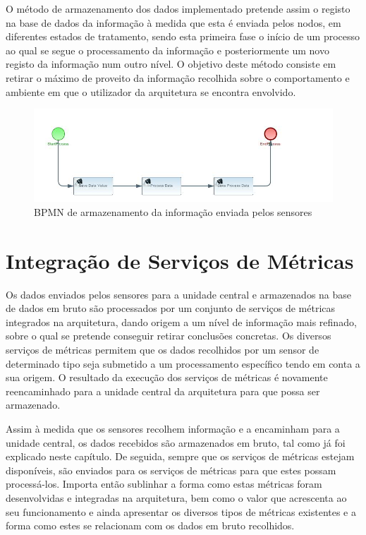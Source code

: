 O método de armazenamento dos dados implementado pretende assim o registo na base de dados da informação à medida que esta é enviada pelos nodos, em diferentes estados de tratamento, sendo esta primeira fase o início de um processo ao qual se segue o processamento da informação e posteriormente um novo registo da informação num outro nível. O objetivo deste método consiste em retirar o máximo de proveito da informação recolhida sobre o comportamento e ambiente em que o utilizador da arquitetura se encontra envolvido. 

\begin{figure}[htb]
   \centering
   \includegraphics[scale=0.6]{Images/SaveDataComponent.jpg}
   \caption{BPMN de armazenamento da informação enviada pelos sensores}
\end{figure}

\section{Integração de Serviços de Métricas}

Os dados enviados pelos sensores para a unidade central e armazenados na base de dados em bruto são processados por um conjunto de serviços de métricas integrados na arquitetura, dando origem a um nível de informação mais refinado, sobre o qual se pretende conseguir retirar conclusões concretas. Os diversos serviços de métricas permitem que os dados recolhidos por um sensor de determinado tipo seja submetido a um processamento específico tendo em conta a sua origem. O resultado da execução dos serviços de métricas é novamente reencaminhado para a unidade central da arquitetura para que possa ser armazenado.

Assim à medida que os sensores recolhem informação e a encaminham para a unidade central, os dados recebidos são armazenados em bruto, tal como já foi explicado neste capítulo. De seguida, sempre que os serviços de métricas estejam disponíveis, são enviados para os serviços de métricas para que estes possam processá-los. Importa então sublinhar a forma como estas métricas foram desenvolvidas e integradas na arquitetura, bem como o valor que acrescenta ao seu funcionamento e ainda apresentar os diversos tipos de métricas existentes e a forma como estes se relacionam com os dados em bruto recolhidos.


